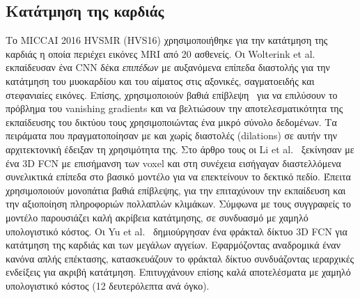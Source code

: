 \subsection{Κατάτμηση της καρδιάς}
Το MICCAI 2016 HVSMR (HVS16) χρησιμοποιήθηκε για την κατάτμηση της καρδιάς η οποία περιέχει εικόνες MRI από 20 ασθενείς.
Οι Wolterink et al.~\cite{wolterink2016dilated} εκπαίδευσαν ένα CNN δέκα \textit{επιπέδων} με αυξανόμενα επίπεδα διαστολής για την κατάτμηση του μυοκαρδίου και του αίματος στις αξονικές, σαγματοειδής και στεφανιαίες εικόνες.
Επίσης, χρησιμοποιούν βαθιά επίβλεψη~\cite{lee2015deeply} για να επιλύσουν το πρόβλημα του vanishing gradients και να βελτιώσουν την αποτελεσματικότητα της εκπαίδευσης του δικτύου τους χρησιμοποιώντας ένα μικρό σύνολο δεδομένων.
Τα πειράματα που πραγματοποίησαν με και χωρίς διαστολές (dilations) σε αυτήν την αρχιτεκτονική έδειξαν τη χρησιμότητα της.
Στο άρθρο τους οι Li et al.~\cite{li2016automatic} ξεκίνησαν με ένα 3D FCN με επισήμανση των voxel και στη συνέχεια εισήγαγαν διαστελλόμενα συνελικτικά επίπεδα στο βασικό μοντέλο για να επεκτείνουν το δεκτικό πεδίο.
Έπειτα χρησιμοποιούν μονοπάτια βαθιά επίβλεψης, για την επιταχύνουν την εκπαίδευση και την αξιοποίηση πληροφοριών πολλαπλών κλιμάκων.
Σύμφωνα με τους συγγραφείς το μοντέλο παρουσιάζει καλή ακρίβεια κατάτμησης, σε συνδυασμό με χαμηλό υπολογιστικό κόστος.
Οι Yu et al.~\cite{yu20163d} δημιούργησαν ένα φράκταλ δίκτυο 3D FCN για κατάτμηση της καρδιάς και των μεγάλων αγγείων.
Εφαρμόζοντας αναδρομικά έναν κανόνα απλής επέκτασης, κατασκευάζουν το φράκταλ δίκτυο συνδυάζοντας ιεραρχικές ενδείξεις για ακριβή κατάτμηση.
Επιτυγχάνουν επίσης καλά αποτελέσματα με χαμηλό υπολογιστικό κόστος (12 δευτερόλεπτα ανά όγκο).

